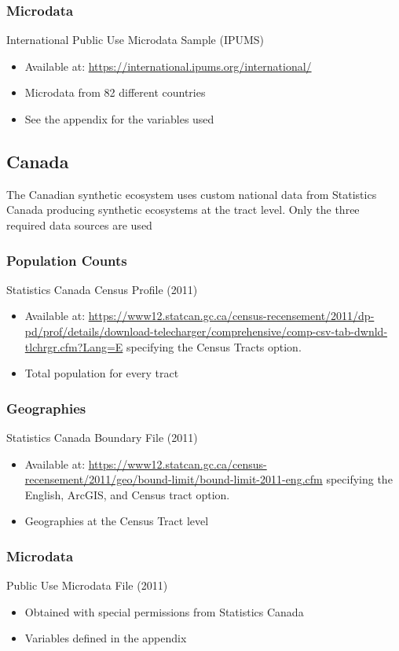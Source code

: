 \documentclass{article}
\begin{document}
\subsubsection{Microdata} \cite{ipumsi}
International Public Use Microdata Sample (IPUMS)
\begin{itemize}			
	\item Available at: \url{https://international.ipums.org/international/}
	\item Microdata from 82 different countries 
	\item See the appendix for the variables used 
\end{itemize}

\subsection{Canada}	
The Canadian synthetic ecosystem uses custom national data from Statistics Canada producing synthetic ecosystems at the tract level. Only the three required data sources are used

\subsubsection{Population Counts}
Statistics Canada Census Profile (2011)
\begin{itemize}
	\item Available at: \url{https://www12.statcan.gc.ca/census-recensement/2011/dp-pd/prof/details/download-telecharger/comprehensive/comp-csv-tab-dwnld-tlchrgr.cfm?Lang=E} specifying the Census Tracts option.
	\item Total population for every tract 
\end{itemize}

\subsubsection{Geographies}
Statistics Canada Boundary File (2011)
\begin{itemize}
	\item Available at: \url{https://www12.statcan.gc.ca/census-recensement/2011/geo/bound-limit/bound-limit-2011-eng.cfm} specifying the English, ArcGIS, and Census tract option.
	\item Geographies at the Census Tract level 
\end{itemize}

\subsubsection{Microdata}
Public Use Microdata File (2011) \cite{statcan}
\begin{itemize}
	\item Obtained with special permissions from Statistics Canada
	\item Variables defined in the appendix
\end{itemize}
\end{document}
